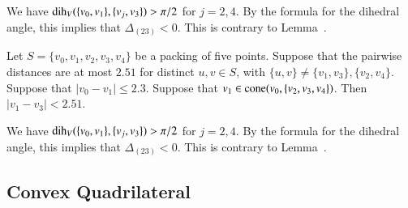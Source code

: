 \begin{tarskidata}
\begin{tarski}
\begin{proved}
We have $\operatorname{dih}_V(\{v_0,v_1\},\{v_j,v_3\})>\pi/2$ for $j=2,4$.
  By the formula for the dihedral angle, this
implies that $\Delta_{(23)}<0$.  This is contrary to Lemma~.
\swallowed\end{proved}
\end{tarski}







\begin{tarski}

\begin{lemma}
Let $S=\{v_0,v_1,v_2,v_3,v_4\}$ be a packing of
five points.  Suppose that the pairwise
distances are at most $2.51$ for distinct $u,v\in S$, with
$\{u,v\}\ne \{v_1,v_3\}, \{v_2,v_4\}$.  Suppose that $|v_0-v_1|\le 2.3$.
Suppose that $v_1\in{\operatorname{cone}}(v_0,\{v_2,v_3,v_4\})$.
Then $|v_1-v_3|< 2.51$.  
\end{lemma}

\begin{proved}
We have $\operatorname{dih}_V(\{v_0,v_1\},\{v_j,v_3\})>\pi/2$ for $j=2,4$.
  By the formula for the dihedral angle, this
implies that $\Delta_{(23)}<0$.  This is contrary to Lemma~.
\swallowed\end{proved}
\end{tarski}









\begin{tarski}
\section{Convex Quadrilateral}


\end{tarski}
\end{tarskidata}
